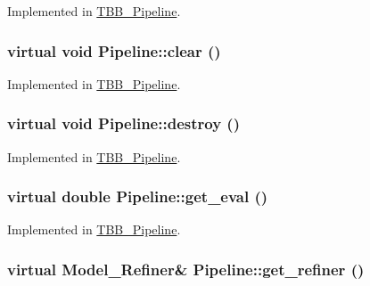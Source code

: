Implemented in \hyperlink{class_t_b_b___pipeline_ae6c06e4aa81d4141810fe48af846357a}{TBB\_\-Pipeline}.

\hypertarget{class_pipeline_a4d58883c3b93f17c56c65474e0179bcb}{
\subsubsection[{clear}]{\setlength{\rightskip}{0pt plus 5cm}virtual void Pipeline::clear ()}}
\label{class_pipeline_a4d58883c3b93f17c56c65474e0179bcb}


Implemented in \hyperlink{class_t_b_b___pipeline_abff2c28ffcec8d6483ab5e5fae829600}{TBB\_\-Pipeline}.

\hypertarget{class_pipeline_aa8eaf1bc52b077b4483f28bd97c60abe}{
\subsubsection[{destroy}]{\setlength{\rightskip}{0pt plus 5cm}virtual void Pipeline::destroy ()}}
\label{class_pipeline_aa8eaf1bc52b077b4483f28bd97c60abe}


Implemented in \hyperlink{class_t_b_b___pipeline_aeaa444a64c92dbf4a3e81ba4864d5086}{TBB\_\-Pipeline}.

\hypertarget{class_pipeline_aabb2894f21a40ef218d08b48e0056671}{
\subsubsection[{get\_\-eval}]{\setlength{\rightskip}{0pt plus 5cm}virtual double Pipeline::get\_\-eval ()}}
\label{class_pipeline_aabb2894f21a40ef218d08b48e0056671}


Implemented in \hyperlink{class_t_b_b___pipeline_aaa0d5fa5c3095a21692e20763a79d11f}{TBB\_\-Pipeline}.

\hypertarget{class_pipeline_af75e9044b4f846daf5dd09064e74b85c}{
\subsubsection[{get\_\-refiner}]{\setlength{\rightskip}{0pt plus 5cm}virtual {\bf Model\_\-Refiner}\& Pipeline::get\_\-refiner ()}}
\label{class_pipeline_af75e9044b4f846daf5dd09064e74b85c}


